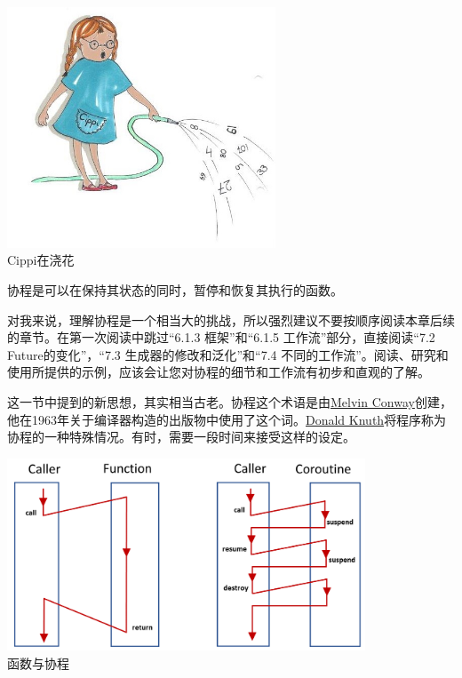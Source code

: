 \begin{center}
\includegraphics[width=0.6\textwidth]{content/3/chapter6/images/2.png}\\
Cippi在浇花
\end{center}

协程是可以在保持其状态的同时，暂停和恢复其执行的函数。

\begin{tcolorbox}[breakable,enhanced jigsaw,colback=red!5!white,colframe=red!75!black,title={挑战：理解协程}]
	
对我来说，理解协程是一个相当大的挑战，所以强烈建议不要按顺序阅读本章后续的章节。在第一次阅读中跳过“6.1.3 框架”和“6.1.5 工作流”部分，直接阅读“7.2 Future的变化”，“7.3 生成器的修改和泛化”和“7.4 不同的工作流”。阅读、研究和使用所提供的示例，应该会让您对协程的细节和工作流有初步和直观的了解。
	
\end{tcolorbox}

这一节中提到的新思想，其实相当古老。协程这个术语是由\href{https://en.wikipedia.org/wiki/Melvin_Conway}{Melvin Conway}创建，他在1963年关于编译器构造的出版物中使用了这个词。\href{https://en.wikipedia.org/wiki/Donald_Knuth}{Donald Knuth}将程序称为协程的一种特殊情况。有时，需要一段时间来接受这样的设定。

\begin{center}
\includegraphics[width=0.8\textwidth]{content/3/chapter6/images/3.png}\\
函数与协程
\end{center}

